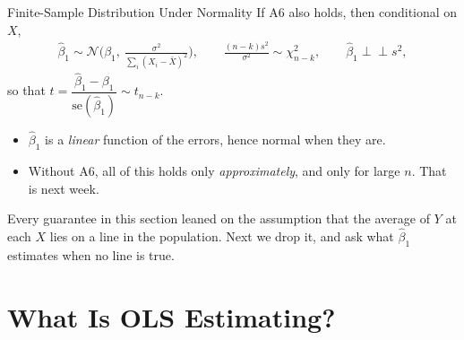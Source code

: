 \documentclass[aspectratio=169,11pt,xcolor=dvipsnames]{beamer}
\newcommand{\indep}{\perp\!\!\!\perp}
\begin{document}
\begin{frame}{Finite-Sample Distribution Under Normality}
If A6 also holds, then conditional on $X$,
\begin{align*}
  \hat\beta_1 \sim \mathcal{N}\Big(\beta_1,\ \tfrac{\sigma^2}{\sum_i (X_i-\bar X)^2}\Big),
  \qquad
  \frac{(n-k)s^2}{\sigma^2} \sim \chi^2_{n-k},
  \qquad
  \hat\beta_1 \indep s^2 ,
\end{align*}
so that
$t = \dfrac{\hat\beta_1 - \beta_1}{\mathrm{se}(\hat\beta_1)} \sim t_{n-k}$.
\vskip6pt
\begin{itemize}
  \item $\hat\beta_1$ is a \emph{linear} function of the errors, hence normal when
        they are.
  \item Without A6, all of this holds only \emph{approximately}, and only for
        large $n$. That is next week.
\end{itemize}
\vskip4pt
\alert{Every guarantee in this section leaned on the assumption that the
average of $Y$ at each $X$ lies on a line in the population. Next we drop it,
and ask what $\hat\beta_1$ estimates when no line is true.}
\end{frame}

\section[CEF and BLP]{What Is OLS Estimating?}
\begin{frame}\sectionpage\end{frame}
\end{document}

